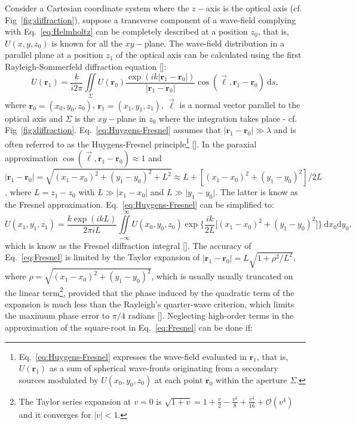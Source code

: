 \begin{refsection}
Consider a Cartesian coordinate system where the $z-$axis is the optical axis (cf. Fig~\ref{fig:diffraction}), suppose a transverse component of a wave-field complying with Eq.~\ref{eq:Helmholtz} can be completely described at a position $z_0$, that is, $U(x,y,z_0)$ is known for all the $xy-$plane. The wave-field distribution in a parallel plane at a position $z_1$ of the optical axis can be calculated using the first Rayleigh-Sommerfeld diffraction equation [\cite[\textit{Eq.~3-42}]{Goodman2017}]:
\begin{equation}\label{eq:Huygens-Fresnel}
    U(\textbf{r}_1) = \frac{k}{i2\pi}\iint\limits_{\Sigma}{U(\textbf{r}_0)\frac{\exp{(ik\vert\textbf{r}_1 - \textbf{r}_0\vert)}}{\vert\textbf{r}_1 - \textbf{r}_0\vert}\cos{(\vec{\ell},\textbf{r}_1 - \textbf{r}_0)}~\mathrm{d}s},
\end{equation}
where $\textbf{r}_0=(x_0,y_0,z_0)$, $\textbf{r}_1=(x_1,y_1,z_1)$, $\vec{\ell}$ is a normal vector parallel to the optical axis and $\Sigma$ is the $xy-$plane in $z_0$ where the integration takes place - cf. Fig~\ref{fig:diffraction}. Eq.~\ref{eq:Huygens-Fresnel} assumes that $\vert\textbf{r}_1 - \textbf{r}_0\vert\gg\lambda$ and is often referred to as the Huygens-Fresnel principle\footnote{Eq.~\ref{eq:Huygens-Fresnel} expresses the wave-field evaluated in $\textbf{r}_1$, that is, $U(\textbf{r}_1)$ as a sum of spherical wave-fronts originating from a secondary sources modulated by $U(x_0,y_0,z_0)$ at each point $\textbf{r}_0$ within the aperture $\Sigma$.} [\cite[\textit{§3.7}]{Goodman2017}]. In the paraxial approximation $\cos{(\vec{\ell},\textbf{r}_1 - \textbf{r}_0)}\approx1$ and $\vert\textbf{r}_1 - \textbf{r}_0\vert=\sqrt{(x_1-x_0)^2+(y_1-y_0)^2+L^2}\approx L +[(x_1-x_0)^2+(y_1-y_0)^2]/2L$, where $L=z_1-z_0$ with $L\gg\vert x_1-x_0\vert$ and $L\gg\vert y_1-y_0\vert$. The latter is know as the Fresnel approximation. Eq.~\ref{eq:Huygens-Fresnel} can be simplified to:
\begin{equation}\label{eq:Fresnel}
    U(x_1,y_1,z_1)=\frac{k\exp{(ikL)}}{2\pi i L}\iint\limits_{-\infty}^{\hspace{8pt}\infty}{U(x_0,y_0,z_0)\exp{\Bigg\{\frac{ik}{2L}\big[(x_1-x_0)^2+(y_1-y_0)^2 \big]\Bigg\}}~\mathrm{d}x_0\mathrm{d}y_0},
\end{equation}
which is know as the Fresnel diffraction integral [\cite[\textit{§4.2}]{Goodman2017}]. The accuracy of Eq.~\ref{eq:Fresnel} is limited by the Taylor expansion of $\vert\textbf{r}_1 - \textbf{r}_0\vert=L\sqrt{1+\rho^2/L^2}$, where  $\rho = \sqrt{(x_1-x_0)^2+(y_1-y_0)^2}$, which is usually usually truncated on the linear term\footnote{The Taylor series expansion at $v=0$ is $\sqrt{1+v}=1+\frac{v}{2}-\frac{v^2}{8}+\frac{v^3}{16}+\mathcal{O}(v^4)$ and it converges for $\vert v\vert<1$.}, provided that the phase induced by the quadratic term of the expansion is much less than the Rayleigh's quarter-wave criterion, which limits the maximum phase error to $\pi/4$ radians [\cite[\textit{§9.3}]{born_wolf1999}]. Neglecting high-order terms in the approximation of the square-root in Eq.~\ref{eq:Fresnel} can be done if:

\end{refsection}

